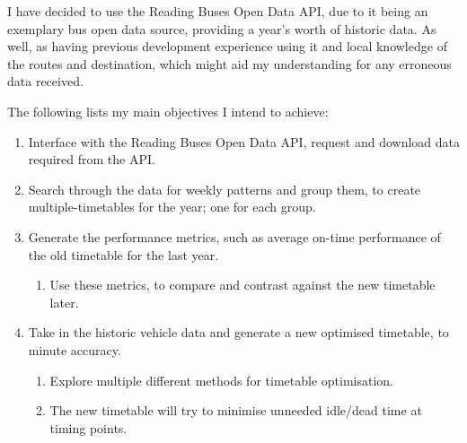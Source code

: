 \documentclass[]{report}
\begin{document}
\vspace{0.5cm}
 I have decided to use the Reading Buses Open Data API, due to it being an exemplary bus open data source, providing a year's worth of historic data. As well, as having previous development experience using it and local knowledge of the routes and destination, which might aid my understanding for any erroneous data received. 

\vspace{0.5cm}
The following lists my main objectives I intend to achieve:


\begin{enumerate}
	\item Interface with the Reading Buses Open Data API, request and download data required from the API.
	\item Search through the data for weekly patterns and group them, to create multiple-timetables for the year; one for each group.
	\item Generate the performance metrics, such as average on-time performance of the old timetable for the last year.
		\begin{enumerate}
		\item Use these metrics, to compare and contrast against the new timetable later. 
	\end{enumerate}
	\item Take in the historic vehicle data and generate a new optimised timetable, to minute accuracy.
	\begin{enumerate}
		\item Explore multiple different methods for timetable optimisation.
		\item The new timetable will try to minimise unneeded idle/dead time at timing points.	

\end{enumerate}
\end{enumerate}
\end{document}
